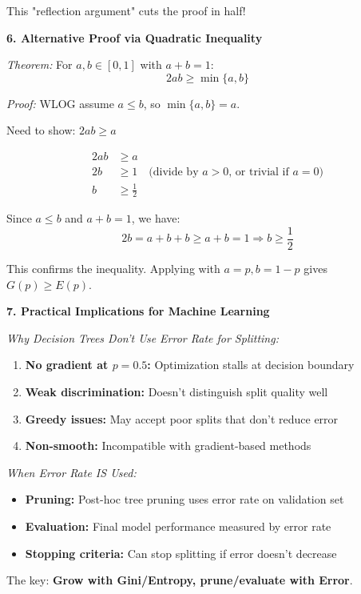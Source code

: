 \documentclass[12pt]{article}
\begin{document}
\begin{explanation}
This "reflection argument" cuts the proof in half!

\textbf{6. Alternative Proof via Quadratic Inequality}

\textit{Theorem:} For $a, b \in [0,1]$ with $a + b = 1$:
\[
2ab \geq \min\{a, b\}
\]

\textit{Proof:} WLOG assume $a \leq b$, so $\min\{a, b\} = a$.

Need to show: $2ab \geq a$

\begin{align*}
2ab &\geq a \\
2b &\geq 1 \quad \text{(divide by } a > 0\text{, or trivial if } a=0\text{)} \\
b &\geq \frac{1}{2}
\end{align*}

Since $a \leq b$ and $a + b = 1$, we have:
\[
2b = a + b + b \geq a + b = 1 \Rightarrow b \geq \frac{1}{2}
\]

This confirms the inequality. Applying with $a = p, b = 1-p$ gives $G(p) \geq E(p)$.

\textbf{7. Practical Implications for Machine Learning}

\textit{Why Decision Trees Don't Use Error Rate for Splitting:}

\begin{enumerate}
    \item \textbf{No gradient at $p=0.5$:} Optimization stalls at decision boundary
    \item \textbf{Weak discrimination:} Doesn't distinguish split quality well
    \item \textbf{Greedy issues:} May accept poor splits that don't reduce error
    \item \textbf{Non-smooth:} Incompatible with gradient-based methods
\end{enumerate}

\textit{When Error Rate IS Used:}

\begin{itemize}
    \item \textbf{Pruning:} Post-hoc tree pruning uses error rate on validation set
    \item \textbf{Evaluation:} Final model performance measured by error rate
    \item \textbf{Stopping criteria:} Can stop splitting if error doesn't decrease
\end{itemize}

The key: \textbf{Grow with Gini/Entropy, prune/evaluate with Error}.


\end{explanation}
\end{document}
